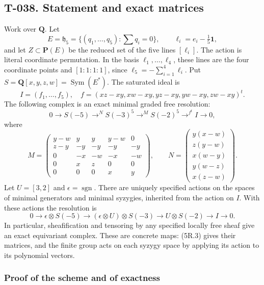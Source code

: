 \documentclass[
  10pt,
]{article}
\begin{document}
\subsection{T-038. Statement and exact
matrices}\label{t-038.-statement-and-exact-matrices}

Work over \(\mathbf Q\). Let \[
E=\mathfrak h_5=\{(q_1,\ldots,q_5):\sum q_i=0\},\qquad
\ell_i=e_i-\tfrac15\mathbf1,
\] and let \(Z\subset\mathbf P(E)\) be the reduced set of the five lines
\([\ell_i]\). The action is literal coordinate permutation. In the basis
\(\ell_1,\ldots,\ell_4\), these lines are the four coordinate points and
\([1:1:1:1]\), since \(\ell_5=-\sum_{i=1}^4\ell_i\). Put
\(S=\mathbf Q[x,y,z,w]=\operatorname{Sym}(E^*)\). The saturated ideal is
\[
I=(f_1,\ldots,f_5),\quad
f=(xz-xy, xw-xy, yz-xy, yw-xy, zw-xy)^t.
\tag{5R.1}
\] The following complex is an exact minimal graded free resolution: \[
0\longrightarrow S(-5)\mathrel{\mathop{\longrightarrow}^{N}}
 S(-3)^5\mathrel{\mathop{\longrightarrow}^{M}}
 S(-2)^5\mathrel{\mathop{\longrightarrow}^{f^t}}I
\longrightarrow0,
\tag{5R.2}
\] where \[
M=\begin{pmatrix}
y-w&y&y&y-w&0\\
z-y&-y&-y&-y&-y\\
0&-x&-w&-x&-w\\
0&x&z&0&0\\
0&0&0&x&y
\end{pmatrix},\qquad
N=\begin{pmatrix}
y(x-w)\\z(y-w)\\x(w-y)\\y(w-z)\\x(z-w)
\end{pmatrix}.
\tag{5R.3}
\] Let \(U=[3,2]\) and \(\epsilon=\operatorname{sgn}\). There are
uniquely specified actions on the spaces of minimal generators and
minimal syzygies, inherited from the action on \(I\). With these actions
the resolution is \[
\boxed{
0\longrightarrow\epsilon\otimes S(-5)
\longrightarrow(\epsilon\otimes U)\otimes S(-3)
\longrightarrow U\otimes S(-2)
\longrightarrow I\longrightarrow0.}
\tag{5R.4}
\] In particular, sheafification and tensoring by any specified locally
free sheaf give an exact equivariant complex. These are concrete maps:
(5R.3) gives their matrices, and the finite group acts on each syzygy
space by applying its action to its polynomial vectors.

\subsubsection{Proof of the scheme and of
exactness}\label{proof-of-the-scheme-and-of-exactness}
\end{document}

